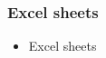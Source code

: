 \begin{frame}

\frametitle{Excel sheets}


\begin{itemize}

\item Excel sheets


\end{itemize}

\end{frame}